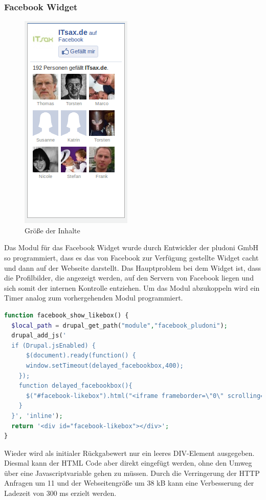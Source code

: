 
\subsubsection{Facebook Widget}
\begin{figure}[!ht]
  \centering
  \includegraphics[scale=0.5]{material/facebook_widget.png}
  \caption{Größe der Inhalte}
  \label{fig:facebookwidget}
\end{figure} Das Modul für das Facebook Widget wurde durch Entwickler der pludoni GmbH so programmiert, dass es das von Facebook zur Verfügung gestellte Widget cacht und dann auf der Webseite darstellt. Das Hauptproblem bei dem Widget ist, dass die Profilbilder, die angezeigt werden, auf den Servern von Facebook liegen und sich somit der internen Kontrolle entziehen. Um das Modul abzukoppeln wird ein Timer analog zum vorhergehenden Modul programmiert. 
\begin{lstlisting}[language=php,label=Facebook Widget,caption=Facebook Widget]
function facebook_show_likebox() {
  $local_path = drupal_get_path("module","facebook_pludoni");
  drupal_add_js('
  if (Drupal.jsEnabled) {
      $(document).ready(function() {
      window.setTimeout(delayed_facebookbox,400);
    });
    function delayed_facebookbox(){
      $("#facebook-likebox").html("<iframe frameborder=\"0\" scrolling=\"no\" src=\"/'.$local_path.'/caching/likebox_cache.html\" id=\"fbooklikebox\"></iframe>");
    }
  }', 'inline');
  return '<div id="facebook-likebox"></div>';
}
\end{lstlisting}
Wieder wird als initialer Rückgabewert nur ein leeres DIV-Element ausgegeben. Diesmal kann der HTML Code aber direkt eingefügt werden, ohne den Umweg über eine Javascriptvariable gehen zu müssen. Durch die Verringerung der HTTP Anfragen um 11 und der Webseitengröße um 38 kB kann eine Verbesserung der Ladezeit von 300 ms erzielt werden. 

